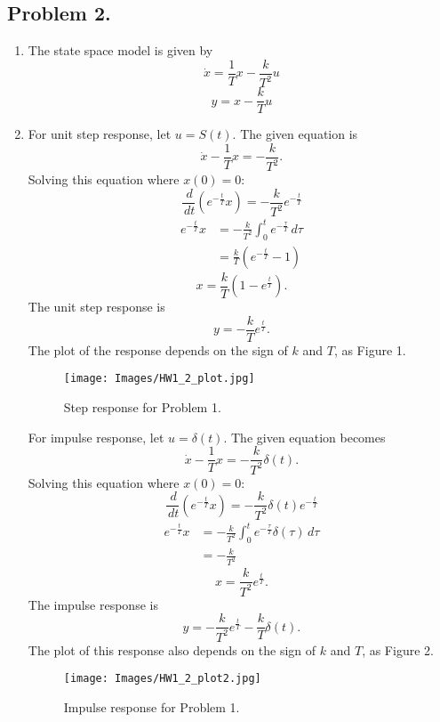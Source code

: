 \documentclass{article}
\begin{document}
\subsection*{Problem 2.}
    \begin{enumerate}
    \item
    The state space model is given by
    $$ \dot{x}=\frac{1}{T}x-\frac{k}{T^{2}}u $$
    $$ y=x-\frac{k}{T}u $$
    
    \item
    For unit step response, let $u=S(t)$. The given equation is
    $$ \dot{x}-\frac{1}{T}x=-\frac{k}{T^{2}}. $$
    Solving this equation where $x(0)=0$:
    $$ \frac{\,d}{\,dt}(e^{-\frac{t}{T}}x)=-\frac{k}{T^{2}}e^{-\frac{t}{T}} $$
    \begin{align}
    e^{-\frac{t}{T}}x& = -\frac{k}{T^{2}}\int_{0}^{t} e^{-\frac{\tau}{T}} {\,d\tau} \\ 
    &= \frac{k}{T}(e^{-\frac{t}{T}}-1)
    \end{align} 
    $$ x = \frac{k}{T}(1-e^{\frac{t}{T}}). $$
    The unit step response is
    $$ y = -\frac{k}{T}e^{\frac{t}{T}}. $$
    The plot of the response depends on the sign of $k$ and $T$, as Figure 1. \\
    \begin{figure}
        \texttt{[image: Images/HW1\_2\_plot.jpg]}
        \caption{Step response for Problem 1.}
    \end{figure} 
    
    For impulse response, let $u=\delta(t)$. The given equation becomes
    $$ \dot{x}-\frac{1}{T}x=-\frac{k}{T^{2}}\delta(t). $$
    Solving this equation where $x(0)=0$:
    $$ \frac{\,d}{\,dt}(e^{-\frac{t}{T}}x)=-\frac{k}{T^{2}}\delta(t)e^{-\frac{t}{T}} $$
    \begin{align}
    e^{-\frac{t}{T}}x& = -\frac{k}{T^{2}}\int_{0}^{t} e^{-\frac{\tau}{T}}\delta(\tau) {\,d\tau} \\ 
    &= -\frac{k}{T^{2}}
    \end{align} 
    $$ x = \frac{k}{T^{2}}e^{\frac{t}{T}}. $$
    The impulse response is
    $$ y = -\frac{k}{T^{2}}e^{\frac{t}{T}}-\frac{k}{T}\delta(t). $$
    The plot of this response also depends on the sign of $k$ and $T$, as Figure 2. \\
    \begin{figure}
        \texttt{[image: Images/HW1\_2\_plot2.jpg]}
        \caption{Impulse response for Problem 1.}
    \end{figure} 
    
    \end{enumerate}
    
\end{document}
